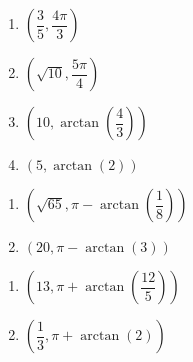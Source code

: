 \begin{multicols}{4}

\begin{enumerate}

\setcounter{enumi}{\value{HW}}

\item $\left( \dfrac{3}{5}, \dfrac{4\pi}{3} \right)$
\item $\left( \sqrt{10}, \dfrac{5\pi}{4} \right)$
\item  $\left( 10, \arctan\left(\dfrac{4}{3}\right) \right)$
\item  $\left( 5, \arctan\left(2\right) \right)$ 

\setcounter{HW}{\value{enumi}}

\end{enumerate}

\end{multicols}

\begin{multicols}{2}

\begin{enumerate}

\setcounter{enumi}{\value{HW}}

\item $\left( \sqrt{65}, \pi - \arctan\left(\dfrac{1}{8}\right)\right)$
\item  $(20, \pi - \arctan(3))$ 

\setcounter{HW}{\value{enumi}}

\end{enumerate}

\end{multicols}

\begin{multicols}{2}

\begin{enumerate}

\setcounter{enumi}{\value{HW}}

\item  $\left(13, \pi + \arctan\left(\dfrac{12}{5}\right) \right)$
\item  $\left(\dfrac{1}{3}, \pi + \arctan\left(2\right) \right)$ 

\setcounter{HW}{\value{enumi}}

\end{enumerate}

\end{multicols}

